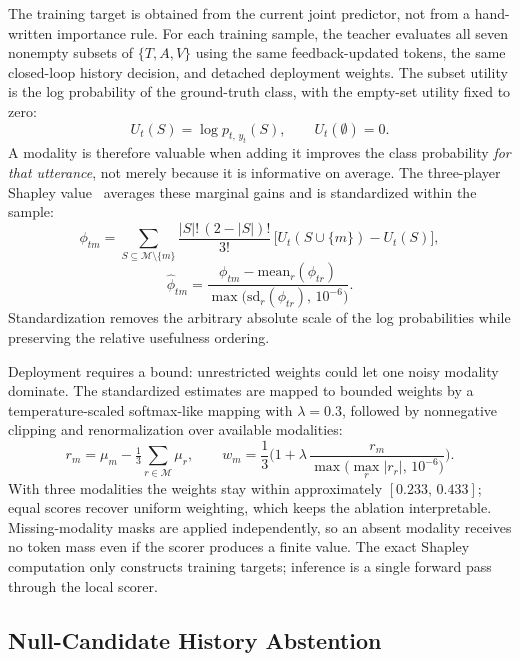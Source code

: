 \documentclass[10pt,twocolumn,letterpaper]{article}
\newcommand{\M}{\mathcal{M}}
\newcommand{\mean}{\mathrm{mean}}
\newcommand{\sd}{\mathrm{sd}}
\begin{document}
The training target is obtained from the current joint predictor, not from a hand-written importance rule.
For each training sample, the teacher evaluates all seven nonempty subsets of $\{T,A,V\}$ using the same feedback-updated tokens, the same closed-loop history decision, and detached deployment weights.
The subset utility is the log probability of the ground-truth class, with the empty-set utility fixed to zero:
\begin{equation}
  U_t(S) = \log p_{t,\,y_t}(S), \qquad U_t(\emptyset) = 0.
  \label{eq:utility}
\end{equation}
A modality is therefore valuable when adding it improves the class probability \emph{for that utterance}, not merely because it is informative on average.
The three-player Shapley value~\cite{shapley1953value} averages these marginal gains and is standardized within the sample:
\begin{equation}
  \phi_{tm} = \sum_{S\subseteq\M\setminus\{m\}} \frac{|S|!\,(2-|S|)!}{3!}\,\big[U_t(S\cup\{m\}) - U_t(S)\big],
  \label{eq:shapley}
\end{equation}
\begin{equation}
  \hat{\phi}_{tm} = \frac{\phi_{tm} - \mean_r(\phi_{tr})}{\max\!\big(\sd_r(\phi_{tr}),\, 10^{-6}\big)}.
  \label{eq:shapleynorm}
\end{equation}
Standardization removes the arbitrary absolute scale of the log probabilities while preserving the relative usefulness ordering.

Deployment requires a bound: unrestricted weights could let one noisy modality dominate.
The standardized estimates are mapped to bounded weights by a temperature-scaled softmax-like mapping with $\lambda=0.3$, followed by nonnegative clipping and renormalization over available modalities:
\begin{equation}
  r_m = \mu_m - \tfrac{1}{3}\sum_{r\in\M}\mu_r, \qquad
  w_m = \frac{1}{3}\Big(1 + \lambda\,\frac{r_m}{\max\big(\max_r |r_r|,\, 10^{-6}\big)}\Big).
  \label{eq:bounded}
\end{equation}
With three modalities the weights stay within approximately $[0.233,\,0.433]$; equal scores recover uniform weighting, which keeps the ablation interpretable.
Missing-modality masks are applied independently, so an absent modality receives no token mass even if the scorer produces a finite value.
The exact Shapley computation only constructs training targets; inference is a single forward pass through the local scorer.

\subsection{Null-Candidate History Abstention}
\label{sec:ncha}
\end{document}
